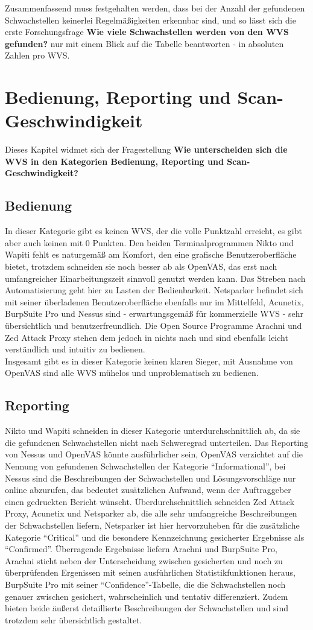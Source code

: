\documentclass[12pt,oneside,a4paper,parskip]{scrbook}
\begin{document}
  Zusammenfassend muss festgehalten werden, dass bei der Anzahl der gefundenen Schwachstellen keinerlei Regelmäßigkeiten erkennbar sind, und so lässt sich die erste Forschungsfrage \textbf{Wie viele Schwachstellen werden von den WVS gefunden?} nur mit einem Blick auf die Tabelle beantworten - in absoluten Zahlen pro WVS.

  \section{Bedienung, Reporting und Scan-Geschwindigkeit}
  Dieses Kapitel widmet sich der Fragestellung \textbf{Wie unterscheiden sich die WVS in den Kategorien Bedienung, Reporting und Scan-Geschwindigkeit?}
  \subsection{Bedienung}
  In dieser Kategorie gibt es keinen WVS, der die volle Punktzahl erreicht, es gibt aber auch keinen mit 0 Punkten. Den beiden Terminalprogrammen Nikto und Wapiti fehlt es naturgemäß am Komfort, den eine grafische Benutzeroberfläche bietet, trotzdem schneiden sie noch besser ab als OpenVAS, das erst nach umfangreicher Einarbeitungszeit sinnvoll genutzt werden kann. Das Streben nach Automatisierung geht hier zu Lasten der Bedienbarkeit. Netsparker befindet sich mit seiner überladenen Benutzeroberfläche ebenfalls nur im Mittelfeld, Acunetix, BurpSuite Pro und Nessus sind - erwartungsgemäß für kommerzielle WVS - sehr übersichtlich und benutzerfreundlich.
  Die Open Source Programme Arachni und Zed Attack Proxy stehen dem jedoch in nichts nach und sind ebenfalls leicht verständlich und intuitiv zu bedienen. \\
  Insgesamt gibt es in dieser Kategorie keinen klaren Sieger, mit Ausnahme von OpenVAS sind alle WVS mühelos und unproblematisch zu bedienen.
  \subsection{Reporting}
  Nikto und Wapiti schneiden in dieser Kategorie unterdurchschnittlich ab, da sie die gefundenen Schwachstellen nicht nach Schweregrad unterteilen. Das Reporting von Nessus und OpenVAS könnte ausführlicher sein, OpenVAS verzichtet auf die Nennung von gefundenen Schwachstellen der Kategorie ``Informational'', bei Nessus sind die Beschreibungen der Schwachstellen und Lösungsvorschläge nur online abzurufen, das bedeutet zusätzlichen Aufwand, wenn der Auftraggeber einen gedruckten Bericht wünscht.
  Überdurchschnittlich schneiden Zed Attack Proxy, Acunetix und Netsparker ab, die alle sehr umfangreiche Beschreibungen der Schwachstellen liefern, Netsparker ist hier hervorzuheben für die zusätzliche Kategorie ``Critical'' und die besondere Kennzeichnung gesicherter Ergebnisse als ``Confirmed''.
  Überragende Ergebnisse liefern Arachni und BurpSuite Pro, Arachni sticht neben der Unterscheidung zwischen gesicherten und noch zu überprüfenden Ergenissen mit seinen ausführlichen Statistikfunktionen heraus, BurpSuite Pro mit seiner ``Confidence''-Tabelle, die die Schwachstellen noch genauer zwischen gesichert, wahrscheinlich und tentativ differenziert. Zudem bieten beide äußerst detaillierte Beschreibungen der Schwachstellen und sind trotzdem sehr übersichtlich gestaltet.
\end{document}
